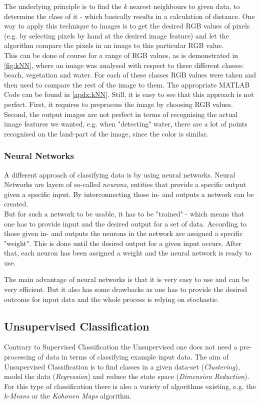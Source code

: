 The underlying principle is to find the \textit{k} nearest neighbours to given data, to determine the class of it - which basically results in a calculation of distance. One way to apply this technique to images is to get the desired RGB values of pixels (e.g. by selecting pixels by hand at the desired image feature) and let the algorithm compare the pixels in an image to this particular RGB value.\\
This can be done of course for a range of RGB values, as is demonstrated in \cref{fig:kNN}, where an image was analysed with respect to three different classes: beach, vegetation and water. For each of these classes RGB values were taken and then used to compare the rest of the image to them. The appropriate MATLAB Code can be found in \cref{apdx:kNN}. Still, it is easy to see that this approach is not perfect. First, it requires to preprocess the image by choosing RGB values. Second, the output images are not perfect in terms of recognising the actual image features we wanted, e.g. when "detecting" water, there are a lot of points recognised on the land-part of the image, since the color is similar.


\subsubsection{Neural Networks}
A different approach of classifying data is by using neural networks. Neural Networks are layers of so-called \textit{neurons}, entities that provide a specific output given a specific input. By interconnecting those in- and outputs a network can be created.\\
But for such a network to be usable, it has to be "trained" - which means that one has to provide input and the desired output for a set of data. According to those given in- and outputs the neurons in the network are assigned a specific "weight". This is done until the desired output for a given input occurs. After that, each neuron has been assigned a weight and the neural network is ready to use.

The main advantage of neural networks is that it is very easy to use and can be very efficient. But it also has some drawbacks as one has to provide the desired outcome for input data and the whole process is relying on stochastic. 

\subsection{Unsupervised Classification}
Contrary to Supervised Classification the Unsupervised one does not need a pre-processing of data in terms of classifying example input data. The aim of Unsupervised Classification is to find classes in a given data-set (\textit{Clustering}), model the data (\textit{Regression}) and reduce the state space (\textit{Dimension Reduction}).\\
For this type of classification there is also a variety of algorithms existing, e.g. the \textit{k-Means} or the \textit{Kohonen Maps} algorithm.

